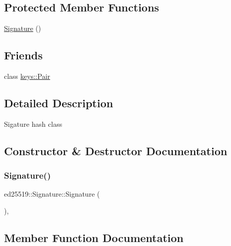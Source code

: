 \subsection*{Protected Member Functions}
\begin{DoxyCompactItemize}
\item 
\mbox{\hyperlink{classed25519_1_1_signature_a49f8ae05dc538ace14141ae2468b0d8c}{Signature}} ()
\end{DoxyCompactItemize}
\subsection*{Friends}
\begin{DoxyCompactItemize}
\item 
class \mbox{\hyperlink{classed25519_1_1_signature_ad89670fe663c8c8526b69b1bc6a87c19}{keys\+::\+Pair}}
\end{DoxyCompactItemize}


\subsection{Detailed Description}
Sigature hash class 

\subsection{Constructor \& Destructor Documentation}
\mbox{\label{classed25519_1_1_signature_a49f8ae05dc538ace14141ae2468b0d8c}} 
\subsubsection{\texorpdfstring{Signature()}{Signature()}}
{\footnotesize\ttfamily ed25519\+::\+Signature\+::\+Signature (\begin{DoxyParamCaption}{ }\end{DoxyParamCaption})\hspace{0.3cm}{\ttfamily [inline]}, {\ttfamily [protected]}}



\subsection{Member Function Documentation}
\mbox{\label{classed25519_1_1_signature_ab25f6998f84d92166a03612587420f2f}} 
